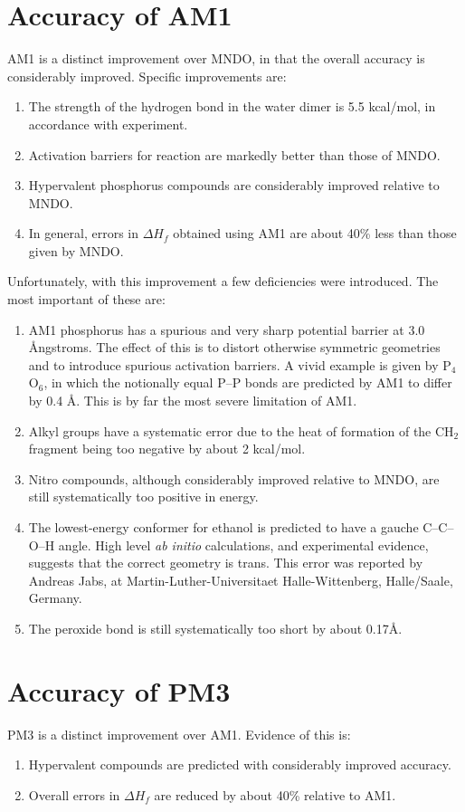 \section{Accuracy of AM1}
AM1 is a distinct improvement over MNDO, in that the overall accuracy is
considerably improved. Specific improvements are:
\begin{enumerate}
\item The strength of the hydrogen bond in the water dimer is 5.5 kcal/mol, in
accordance with experiment.
\item Activation barriers for reaction are markedly better than those of MNDO.
\item Hypervalent phosphorus compounds are considerably improved relative to
MNDO.
\item In general, errors in $\Delta H_f$ obtained using AM1 are about 40\%
less than those given by MNDO.
\end{enumerate}

Unfortunately, with this improvement a few deficiencies were introduced. The
most important of these are:
\begin{enumerate}
\item{} AM1 phosphorus has a spurious and very sharp
potential barrier at 3.0 \AA ngstroms. The effect of this is to distort
otherwise symmetric geometries and to introduce spurious activation barriers. A
vivid example is given by P$_4$O$_6$, in which the notionally equal P--P bonds
are predicted by AM1 to differ by 0.4 \AA . This is by far the most severe
limitation of AM1.
\item Alkyl groups have a systematic error due to the heat of formation of the
CH$_2$ fragment being too negative by about 2 kcal/mol.
\item Nitro compounds, although considerably improved relative to MNDO, are
still systematically too positive in energy.
\item The lowest-energy conformer for ethanol is predicted to have a gauche 
C--C--O--H angle.  High level {\em ab initio} calculations, and experimental 
evidence, suggests that the correct geometry is trans.  This error was 
reported by Andreas Jabs, at Martin-Luther-Universitaet Halle-Wittenberg,
Halle/Saale, Germany.
\item The peroxide bond is still systematically too short by about 0.17\AA.
\end{enumerate}

\section{Accuracy of PM3}
PM3 is a distinct improvement over AM1. Evidence of this is:
\begin{enumerate}
\item Hypervalent compounds are predicted with considerably improved accuracy.
\item Overall errors in $\Delta H_f$ are reduced by about 40\% relative to AM1.
\end{enumerate}

